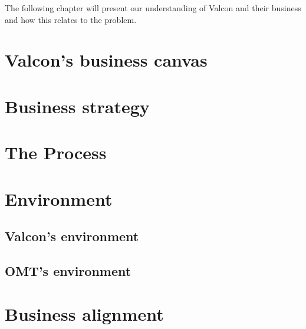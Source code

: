 The following chapter will present our understanding of Valcon and their business and how this relates to the problem. 

\section{Valcon's business canvas}

\section{Business strategy}

\section{The Process}

\section{Environment}
\subsection{Valcon's environment}

\subsection{OMT's environment}

\section{Business alignment}

